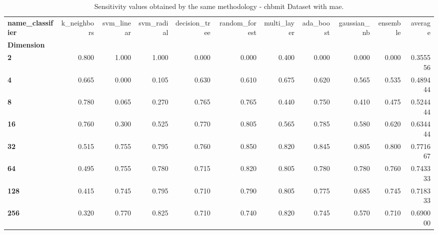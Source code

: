 \begin{table}
\centering
\caption{Sensitivity values obtained by the same methodology - chbmit Dataset with mae.}
\label{sensitivity_chbmit_mae-reproduction}
\begin{tabular}{lrrrrrrrrrr}
\toprule
\textbf{name\_classifier} &  k\_neighbors &  svm\_linear &  svm\_radial &  decision\_tree &  random\_forest &  multi\_layer &  ada\_boost &  gaussian\_nb &  ensemble &   average \\
\textbf{Dimension} &              &             &             &                &                &              &            &              &           &           \\
\midrule
\textbf{2        } &        0.800 &       1.000 &       1.000 &          0.000 &          0.000 &        0.400 &      0.000 &        0.000 &     0.000 &  0.355556 \\
\textbf{4        } &        0.665 &       0.000 &       0.105 &          0.630 &          0.610 &        0.675 &      0.620 &        0.565 &     0.535 &  0.489444 \\
\textbf{8        } &        0.780 &       0.065 &       0.270 &          0.765 &          0.765 &        0.440 &      0.750 &        0.410 &     0.475 &  0.524444 \\
\textbf{16       } &        0.760 &       0.300 &       0.525 &          0.770 &          0.805 &        0.565 &      0.785 &        0.580 &     0.620 &  0.634444 \\
\textbf{32       } &        0.515 &       0.755 &       0.795 &          0.760 &          0.850 &        0.820 &      0.845 &        0.805 &     0.800 &  0.771667 \\
\textbf{64       } &        0.495 &       0.755 &       0.780 &          0.715 &          0.820 &        0.805 &      0.780 &        0.780 &     0.760 &  0.743333 \\
\textbf{128      } &        0.415 &       0.745 &       0.795 &          0.710 &          0.790 &        0.805 &      0.775 &        0.685 &     0.745 &  0.718333 \\
\textbf{256      } &        0.320 &       0.770 &       0.825 &          0.710 &          0.740 &        0.820 &      0.745 &        0.570 &     0.710 &  0.690000 \\
\bottomrule
\end{tabular}
\end{table}
